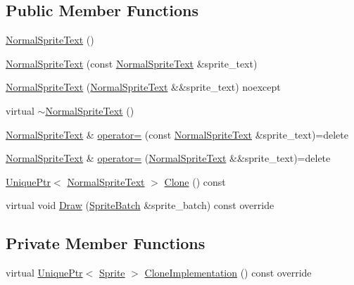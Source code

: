 \subsection*{Public Member Functions}
\begin{DoxyCompactItemize}
\item 
\hyperlink{classmage_1_1_normal_sprite_text_a1e932ddea2c5b96b0dc500c8cd7f09a7}{Normal\+Sprite\+Text} ()
\item 
\hyperlink{classmage_1_1_normal_sprite_text_aa73a83a29b28d7b5f20240f3074e5d4d}{Normal\+Sprite\+Text} (const \hyperlink{classmage_1_1_normal_sprite_text}{Normal\+Sprite\+Text} \&sprite\+\_\+text)
\item 
\hyperlink{classmage_1_1_normal_sprite_text_a5c5cacdef40bf1c5aaf7351cd0714b17}{Normal\+Sprite\+Text} (\hyperlink{classmage_1_1_normal_sprite_text}{Normal\+Sprite\+Text} \&\&sprite\+\_\+text) noexcept
\item 
virtual \hyperlink{classmage_1_1_normal_sprite_text_ae8575ab8ece5b8b923509fc7ab4d3dea}{$\sim$\+Normal\+Sprite\+Text} ()
\item 
\hyperlink{classmage_1_1_normal_sprite_text}{Normal\+Sprite\+Text} \& \hyperlink{classmage_1_1_normal_sprite_text_ab7dbd2e71dcaef5d6b7b767afa8d7094}{operator=} (const \hyperlink{classmage_1_1_normal_sprite_text}{Normal\+Sprite\+Text} \&sprite\+\_\+text)=delete
\item 
\hyperlink{classmage_1_1_normal_sprite_text}{Normal\+Sprite\+Text} \& \hyperlink{classmage_1_1_normal_sprite_text_a54cb023fad3b66dba35854ceaa50bc44}{operator=} (\hyperlink{classmage_1_1_normal_sprite_text}{Normal\+Sprite\+Text} \&\&sprite\+\_\+text)=delete
\item 
\hyperlink{namespacemage_a3316d7143a973e37adf1110f2e80ca31}{Unique\+Ptr}$<$ \hyperlink{classmage_1_1_normal_sprite_text}{Normal\+Sprite\+Text} $>$ \hyperlink{classmage_1_1_normal_sprite_text_a8357ea517cff639204da4825024d9d34}{Clone} () const
\item 
virtual void \hyperlink{classmage_1_1_normal_sprite_text_ad2a1b02bea18afd6bf61b106a727a355}{Draw} (\hyperlink{classmage_1_1_sprite_batch}{Sprite\+Batch} \&sprite\+\_\+batch) const override
\end{DoxyCompactItemize}
\subsection*{Private Member Functions}
\begin{DoxyCompactItemize}
\item 
virtual \hyperlink{namespacemage_a3316d7143a973e37adf1110f2e80ca31}{Unique\+Ptr}$<$ \hyperlink{classmage_1_1_sprite}{Sprite} $>$ \hyperlink{classmage_1_1_normal_sprite_text_acab5b61f8be4a475cd54b51278956e37}{Clone\+Implementation} () const override
\end{DoxyCompactItemize}
